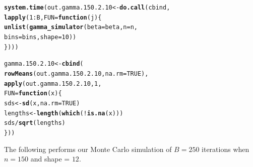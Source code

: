 \documentclass[11pt]{article}\usepackage[]{graphicx}\usepackage[]{color}
\makeatletter
\newcommand{\hlnum}[1]{\textcolor[rgb]{0.686,0.059,0.569}{#1}}%
\newcommand{\hlopt}[1]{\textcolor[rgb]{0,0,0}{#1}}%
\newcommand{\hlstd}[1]{\textcolor[rgb]{0.345,0.345,0.345}{#1}}%
\newcommand{\hlkwa}[1]{\textcolor[rgb]{0.161,0.373,0.58}{\textbf{#1}}}%
\newcommand{\hlkwb}[1]{\textcolor[rgb]{0.69,0.353,0.396}{#1}}%
\newcommand{\hlkwc}[1]{\textcolor[rgb]{0.333,0.667,0.333}{#1}}%
\newcommand{\hlkwd}[1]{\textcolor[rgb]{0.737,0.353,0.396}{\textbf{#1}}}%
\newenvironment{kframe}{%
 \def\at@end@of@kframe{}%
 \ifinner\ifhmode%
  \def\at@end@of@kframe{\end{minipage}}%
  \begin{minipage}{\columnwidth}%
 \fi\fi%
 \def\FrameCommand##1{\hskip\@totalleftmargin \hskip-\fboxsep
 \colorbox{shadecolor}{##1}\hskip-\fboxsep
     \hskip-\linewidth \hskip-\@totalleftmargin \hskip\columnwidth}%
 \MakeFramed {\advance\hsize-\width
   \@totalleftmargin\z@ \linewidth\hsize
   \@setminipage}}%
 {\par\unskip\endMakeFramed%
 \at@end@of@kframe}
\newenvironment{knitrout}{}{} %
\makeatother
\begin{document}
\begin{knitrout}
\color{fgcolor}\begin{kframe}
\begin{alltt}
\hlkwd{system.time}\hlstd{(out.gamma.150.2.10} \hlkwb{<-} \hlkwd{do.call}\hlstd{(cbind,}
  \hlkwd{lapply}\hlstd{(}\hlnum{1}\hlopt{:}\hlstd{B,} \hlkwc{FUN} \hlstd{=} \hlkwa{function}\hlstd{(}\hlkwc{j}\hlstd{)\{}
    \hlkwd{unlist}\hlstd{(}\hlkwd{gamma_simulator}\hlstd{(}\hlkwc{beta} \hlstd{= beta,} \hlkwc{n} \hlstd{= n,}
      \hlkwc{bins} \hlstd{= bins,} \hlkwc{shape} \hlstd{=} \hlnum{10}\hlstd{))}
\hlstd{\})))}
\end{alltt}


{\ttfamily\noindent\bfseries\color{errorcolor}{\#\# Error in eval(family\$initialize): non-positive values not allowed for the 'gamma' family}}

{\ttfamily\noindent\itshape\color{messagecolor}{\#\# Timing stopped at: 0.005 0 0.006}}\end{kframe}
\end{knitrout}

\begin{knitrout}
\color{fgcolor}\begin{kframe}
\begin{alltt}
\hlstd{gamma.150.2.10} \hlkwb{<-} \hlkwd{cbind}\hlstd{(}
  \hlkwd{rowMeans}\hlstd{(out.gamma.150.2.10,} \hlkwc{na.rm} \hlstd{=} \hlnum{TRUE}\hlstd{),}
  \hlkwd{apply}\hlstd{(out.gamma.150.2.10,} \hlnum{1}\hlstd{,}
  \hlkwc{FUN} \hlstd{=} \hlkwa{function}\hlstd{(}\hlkwc{x}\hlstd{)\{}
    \hlstd{sds} \hlkwb{<-} \hlkwd{sd}\hlstd{(x,} \hlkwc{na.rm} \hlstd{=} \hlnum{TRUE}\hlstd{)}
    \hlstd{lengths} \hlkwb{<-} \hlkwd{length}\hlstd{(}\hlkwd{which}\hlstd{(}\hlopt{!}\hlkwd{is.na}\hlstd{(x)))}
    \hlstd{sds} \hlopt{/} \hlkwd{sqrt}\hlstd{(lengths)}
  \hlstd{\}))}
\end{alltt}


{\ttfamily\noindent\bfseries\color{errorcolor}{\#\# Error in is.data.frame(x): object 'out.gamma.150.2.10' not found}}\end{kframe}
\end{knitrout}

The following performs our Monte Carlo simulation of $B = 250$ iterations 
when $n = 150$ and shape = $12$.
\end{document}
